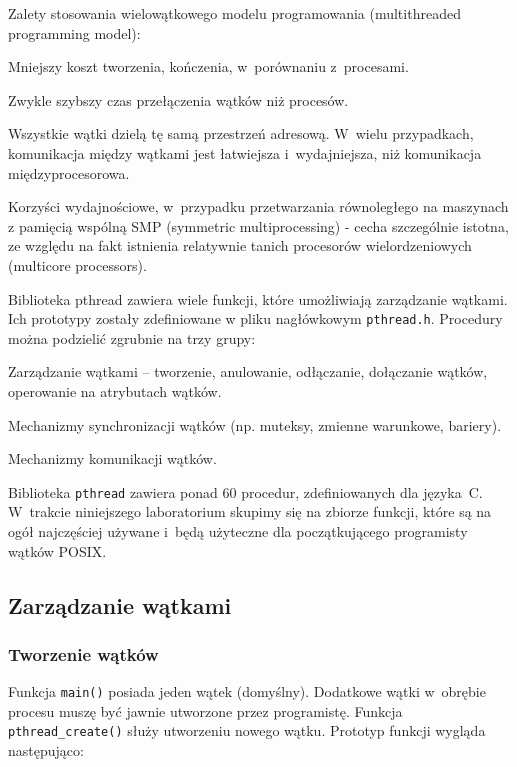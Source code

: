 Zalety stosowania wielowątkowego modelu programowania (multithreaded programming model):

\begin{myitemize}
\item Mniejszy koszt tworzenia, kończenia, w~porównaniu z~procesami.
\item Zwykle szybszy czas przełączenia wątków niż procesów. 
\item Wszystkie wątki dzielą tę samą przestrzeń adresową. W~wielu przypadkach, komunikacja między wątkami jest łatwiejsza i~wydajniejsza, niż komunikacja międzyprocesorowa.
\item Korzyści wydajnościowe, w~przypadku przetwarzania równoległego na maszynach z pamięcią wspólną SMP (symmetric multiprocessing) - cecha szczególnie istotna, ze względu na fakt istnienia relatywnie tanich procesorów wielordzeniowych (multicore processors).
\end{myitemize}

Biblioteka pthread zawiera wiele funkcji, które umożliwiają zarządzanie wątkami. Ich prototypy zostały zdefiniowane w pliku nagłówkowym \lstinline[style=MyBashStyle]{pthread.h}.  Procedury można podzielić zgrubnie na trzy grupy:

\begin{myitemize}
\item Zarządzanie wątkami – tworzenie, anulowanie, odłączanie, dołączanie wątków, operowanie na atrybutach wątków.
\item Mechanizmy synchronizacji wątków (np. muteksy, zmienne warunkowe, bariery).
\item Mechanizmy komunikacji wątków. 
\end{myitemize}
  
Biblioteka \lstinline[style=MyBashStyle]{pthread} zawiera ponad 60 procedur, zdefiniowanych dla języka~C. W~trakcie niniejszego laboratorium skupimy się na zbiorze funkcji, które są na ogół najczęściej używane i~będą użyteczne dla początkującego programisty wątków POSIX. 

\subsection{Zarządzanie wątkami}
\subsubsection{Tworzenie wątków}

Funkcja \lstinline[style=MyCStyle]{main()} posiada jeden wątek (domyślny). Dodatkowe wątki w~obrębie procesu muszę być jawnie utworzone przez programistę. Funkcja \lstinline[style=MyCStyle]{pthread_create()} służy utworzeniu nowego wątku. Prototyp funkcji wygląda następująco: 


